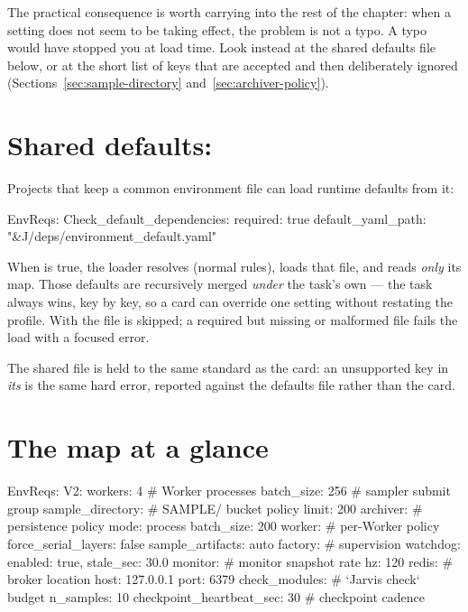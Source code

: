 The practical consequence is worth carrying into the rest of the chapter: when a
 setting does not seem to be taking effect, the problem is not a typo. A typo
would have stopped you at load time. Look instead at the shared defaults file below, or at
the short list of keys that are accepted and then deliberately ignored
(Sections~\ref{sec:sample-directory} and~\ref{sec:archiver-policy}).

\section{Shared defaults: }
\label{sec:check-default-deps}

Projects that keep a common environment file can load runtime defaults from it:

\begin{yamlwin}
EnvReqs:
  Check_default_dependencies:
    required: true
    default_yaml_path: "&J/deps/environment_default.yaml"
\end{yamlwin}

When  is true, the loader resolves  (normal
 rules), loads that file, and reads \emph{only} its  map.
Those defaults are recursively merged \emph{under} the task's own  ---
the task always wins, key by key, so a card can override one setting without restating the
profile. With  the file is skipped; a required but missing or
malformed file fails the load with a focused error.

The shared file is held to the same standard as the card: an unsupported key in
\emph{its}  is the same hard error, reported against the defaults
file rather than the card.

\section{The  map at a glance}
\label{sec:v2-map}

\begin{yamlwin}
EnvReqs:
  V2:
    workers: 4              # Worker processes
    batch_size: 256         # sampler submit group
    sample_directory:       # SAMPLE/ bucket policy
      limit: 200
    archiver:               # persistence policy
      mode: process
      batch_size: 200
    worker:                 # per-Worker policy
      force_serial_layers: false
      sample_artifacts: auto
    factory:                # supervision
      watchdog: {enabled: true, stale_sec: 30.0}
    monitor:                # monitor snapshot rate
      hz: 120
    redis:                  # broker location
      host: 127.0.0.1
      port: 6379
    check_modules:          # `Jarvis check` budget
      n_samples: 10
    checkpoint_heartbeat_sec: 30   # checkpoint cadence
\end{yamlwin}

